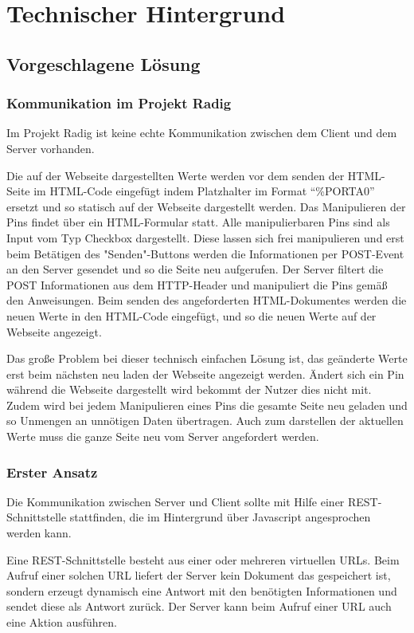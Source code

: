 \chapter{Technischer Hintergrund}

\section{Vorgeschlagene Lösung}

\subsection{Kommunikation im Projekt Radig}
Im Projekt Radig ist keine echte Kommunikation zwischen dem Client und dem Server
vorhanden.

Die auf der Webseite dargestellten Werte werden vor dem senden der HTML-Seite
im HTML-Code eingefügt indem Platzhalter im Format "`\%PORTA0"' ersetzt und so statisch auf
der Webseite dargestellt werden. Das Manipulieren der Pins findet über ein HTML-Formular
statt. Alle manipulierbaren Pins sind als Input vom Typ Checkbox dargestellt. Diese lassen
sich frei manipulieren und erst beim Betätigen des "Senden"-Buttons werden die
Informationen per POST-Event an den Server gesendet und so die Seite neu aufgerufen. Der
Server filtert die POST Informationen aus dem HTTP-Header und manipuliert die Pins gemäß
den Anweisungen. Beim senden des angeforderten HTML-Dokumentes werden die neuen Werte in
den HTML-Code eingefügt, und so die neuen Werte auf der Webseite angezeigt.

Das große Problem bei dieser technisch einfachen Lösung ist, das geänderte Werte erst beim
nächsten neu laden der Webseite angezeigt werden. Ändert sich ein Pin während die Webseite
dargestellt wird bekommt der Nutzer dies nicht mit. Zudem wird bei jedem Manipulieren
eines Pins die gesamte Seite neu geladen und so Unmengen an unnötigen Daten übertragen.
Auch zum darstellen der aktuellen Werte muss die ganze Seite neu vom Server angefordert
werden.

\subsection{Erster Ansatz}
Die Kommunikation zwischen Server und Client sollte mit Hilfe einer REST-Schnittstelle
stattfinden, die im Hintergrund über Javascript angesprochen werden kann.

Eine REST-Schnittstelle besteht aus einer oder mehreren virtuellen URLs. Beim Aufruf einer
solchen URL liefert der Server kein Dokument das gespeichert ist, sondern erzeugt
dynamisch eine Antwort mit den benötigten Informationen und sendet diese als Antwort
zurück. Der Server kann beim Aufruf einer URL auch eine Aktion ausführen.

